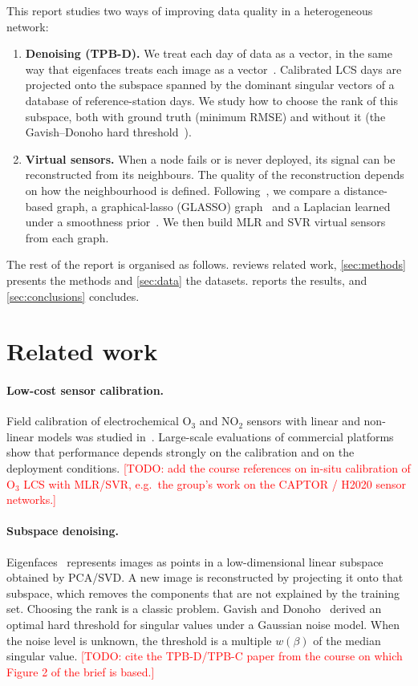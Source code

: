 \documentclass[11pt,a4paper]{article}
\newcommand{\todo}[1]{\textcolor{red}{[TODO: #1]}}
\newcommand{\Othree}{O$_3$}
\begin{document}
This report studies two ways of improving data quality in a heterogeneous network:
\begin{enumerate}
  \item \textbf{Denoising (TPB-D).} We treat each day of data as a vector, in the same way that eigenfaces treats each image as a vector~\cite{turk1991}. Calibrated LCS days are projected onto the subspace spanned by the dominant singular vectors of a database of reference-station days. We study how to choose the rank of this subspace, both with ground truth (minimum RMSE) and without it (the Gavish--Donoho hard threshold~\cite{gavish2014}).
  \item \textbf{Virtual sensors.} When a node fails or is never deployed, its signal can be reconstructed from its neighbours. The quality of the reconstruction depends on how the neighbourhood is defined. Following~\cite{ferrercid2021}, we compare a distance-based graph, a graphical-lasso (GLASSO) graph~\cite{friedman2008} and a Laplacian learned under a smoothness prior~\cite{dong2015,dong2016}. We then build MLR and SVR virtual sensors from each graph.
\end{enumerate}

The rest of the report is organised as follows.  reviews related work, \cref{sec:methods} presents the methods and \cref{sec:data} the datasets.  reports the results, and \cref{sec:conclusions} concludes.

\section{Related work}\label{sec:related}
\paragraph{Low-cost sensor calibration.} Field calibration of electrochemical \Othree{} and NO$_2$ sensors with linear and non-linear models was studied in~\cite{spinelle2015}. Large-scale evaluations of commercial platforms~\cite{castell2017} show that performance depends strongly on the calibration and on the deployment conditions. \todo{add the course references on in-situ calibration of O$_3$ LCS with MLR/SVR, e.g.\ the group's work on the CAPTOR / H2020 sensor networks.}

\paragraph{Subspace denoising.} Eigenfaces~\cite{turk1991} represents images as points in a low-dimensional linear subspace obtained by PCA/SVD. A new image is reconstructed by projecting it onto that subspace, which removes the components that are not explained by the training set. Choosing the rank is a classic problem. Gavish and Donoho~\cite{gavish2014} derived an optimal hard threshold for singular values under a Gaussian noise model. When the noise level is unknown, the threshold is a multiple $w(\beta)$ of the median singular value. \todo{cite the TPB-D/TPB-C paper from the course on which Figure 2 of the brief is based.}
\end{document}
